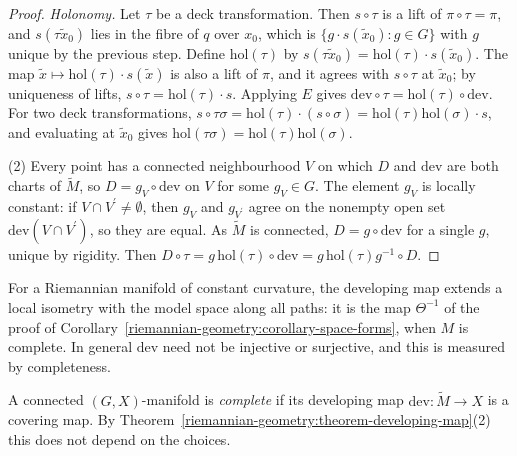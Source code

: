 \begin{proof}
\emph{Holonomy.} Let $\tau$ be a deck transformation. Then $s \circ \tau$ is a lift of $\pi \circ \tau = \pi$, and $s(\tau\tilde x_0)$ lies in the fibre of $q$ over $x_0$, which is $\{g \cdot s(\tilde x_0) : g \in G\}$ with $g$ unique by the
previous step. Define $\mathrm{hol}(\tau)$ by $s(\tau\tilde x_0) = \mathrm{hol}(\tau) \cdot s(\tilde x_0)$. The map $\tilde x \mapsto \mathrm{hol}(\tau) \cdot s(\tilde x)$ is also a lift of $\pi$, and it agrees with $s \circ \tau$ at $\tilde x_0$;
by uniqueness of lifts, $s \circ \tau = \mathrm{hol}(\tau) \cdot s$. Applying $E$ gives $\mathrm{dev} \circ \tau = \mathrm{hol}(\tau) \circ \mathrm{dev}$. For two deck transformations,
$s \circ \tau\sigma = \mathrm{hol}(\tau) \cdot (s \circ \sigma) = \mathrm{hol}(\tau)\mathrm{hol}(\sigma) \cdot s$, and evaluating at $\tilde x_0$ gives $\mathrm{hol}(\tau\sigma) = \mathrm{hol}(\tau)\mathrm{hol}(\sigma)$.

(2) Every point has a connected neighbourhood $V$ on which $D$ and $\mathrm{dev}$ are both charts of $\widetilde{M}$, so $D = g_V \circ \mathrm{dev}$ on $V$ for some $g_V \in G$. The element $g_V$ is locally constant: if $V \cap V^{\prime} \neq \emptyset$, then $g_V$ and $g_{V^{\prime}}$ agree on the
nonempty open set $\mathrm{dev}(V \cap V^{\prime})$, so they are equal. As $\widetilde{M}$ is connected, $D = g \circ \mathrm{dev}$ for a single $g$, unique by rigidity. Then
$D \circ \tau = g\,\mathrm{hol}(\tau) \circ \mathrm{dev} = g\,\mathrm{hol}(\tau)g^{-1} \circ D$.
\end{proof}

For a Riemannian manifold of constant curvature, the developing map extends a local isometry with the model space along all paths: it is the map $\Theta^{-1}$ of the proof of
Corollary~\ref{riemannian-geometry:corollary-space-forms}, when $M$ is complete. In general $\mathrm{dev}$ need not be injective or surjective, and this is measured by completeness.

\begin{definition}\label{riemannian-geometry:definition-complete-gx}
A connected $(G, X)$-manifold is \emph{complete} if its developing map $\mathrm{dev} \colon \widetilde{M} \to X$ is a covering map. By Theorem~\ref{riemannian-geometry:theorem-developing-map}(2) this does not depend on the choices.
\end{definition}

